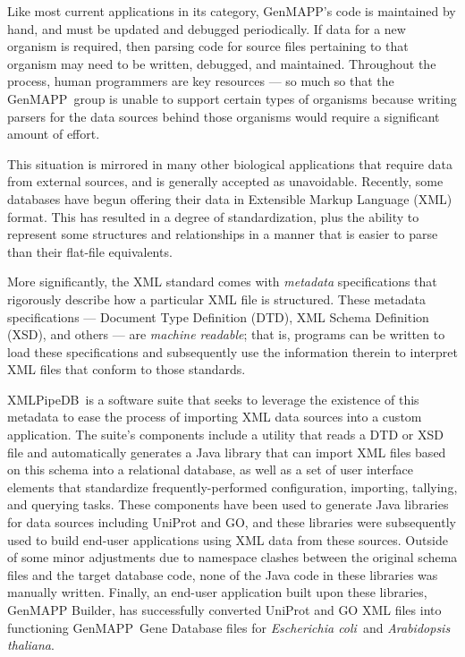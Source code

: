 \documentclass[10pt]{bmc_article}
\newenvironment{bmcformat}{\begin{raggedright}\baselineskip20pt\sloppy\setboolean{publ}{false}}{\end{raggedright}\baselineskip20pt\sloppy}
\def\genmapp{GenMAPP}                  %
\def\xmlpipedb{XMLPipeDB}                       %
\def\gmb{GenMAPP Builder}
\def\ecolifull{\emph{Escherichia coli}}
\def\athalianafull{\emph{Arabidopsis thaliana}}
\begin{document}
\begin{bmcformat}
Like most current applications in its category, \genmapp's code is maintained by hand, and must be updated and debugged periodically.  If data for a new organism is required, then parsing code for source files pertaining to that organism may need to be written, debugged, and maintained.  Throughout the process, human programmers are key resources --- so much so that the \genmapp\ group is unable to support certain types of organisms because writing parsers for the data sources behind those organisms would require a significant amount of effort.\pb

This situation is mirrored in many other biological applications that require data from external sources, and is generally accepted as unavoidable.  Recently, some databases have begun offering their data in Extensible Markup Language (XML) format.  This has resulted in a degree of standardization, plus the ability to represent some structures and relationships in a manner that is easier to parse than their flat-file equivalents.\pb

More significantly, the XML standard comes with \emph{metadata} specifications that rigorously describe how a particular XML file is structured.  These metadata specifications --- Document Type Definition (DTD), XML Schema Definition (XSD), and others --- are \emph{machine readable}\/; that is, programs can be written to load these specifications and subsequently use the information therein to interpret XML files that conform to those standards.\pb

\xmlpipedb\ is a software suite that seeks to leverage the existence of this metadata to ease the process of importing XML data sources into a custom application.  The suite's components include a utility that reads a DTD or XSD file and automatically generates a Java library that can import XML files based on this schema into a relational database, as well as a set of user interface elements that standardize frequently-performed configuration, importing, tallying, and querying tasks.  These components have been used to generate Java libraries for data sources including UniProt and GO, and these libraries were subsequently used to build end-user applications using XML data from these sources.  Outside of some minor adjustments due to namespace clashes between the original schema files and the target database code, none of the Java code in these libraries was manually written.  Finally, an end-user application built upon these libraries, \gmb, has successfully converted UniProt and GO XML files into functioning \genmapp\ Gene Database files for \ecolifull\ and \athalianafull.\pb


\end{bmcformat}
\end{document}
